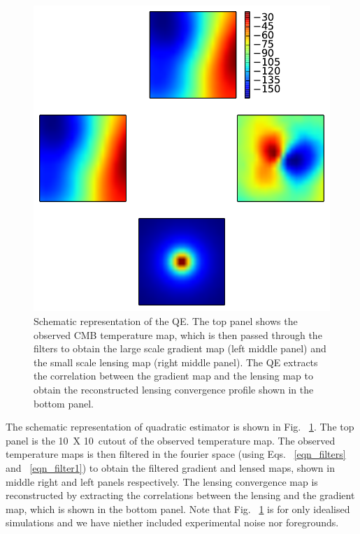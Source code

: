  \begin{figure}[!ht]
\includegraphics[width=\linewidth]{figs/schematic_rep.pdf}
\caption{Schematic representation of the QE. The top panel shows the observed CMB temperature map, which is then passed through the filters to obtain the large scale gradient map (left middle panel) and the small scale lensing map (right middle panel). The QE extracts the correlation between the gradient map and the lensing map to obtain the reconstructed lensing convergence profile shown in the bottom panel.}
\label{fig:QE_schem}
\end{figure}
The schematic representation of quadratic estimator is shown in Fig. ~\ref{fig:QE_schem}. 
The top panel is the 10\arcmin\ X 10\arcmin\ cutout of the observed temperature map. 
The observed temperature maps is then filtered in the fourier space (using Eqs. ~\ref{eqn_filters} and ~\ref{eqn_filter1}) to obtain the filtered gradient and lensed maps, shown in middle right and left panels respectively.
The lensing convergence map is reconstructed by extracting the correlations between the lensing and the gradient map, which is shown in the bottom panel.
 Note that Fig. ~\ref{fig:QE_schem} is for only idealised simulations and we have niether included experimental noise nor foregrounds.

